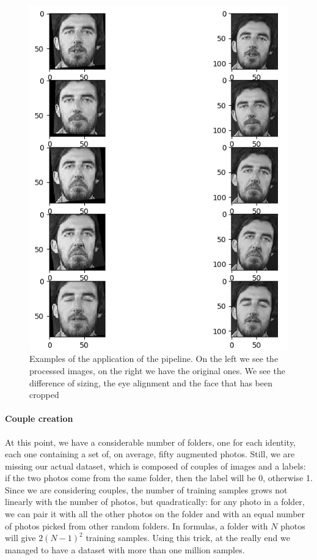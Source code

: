 \begin{figure}[t]
\includegraphics[width=1\linewidth]{images/processed.png}
   \caption{Examples of the application of the pipeline. On the left we see the processed images, on the right we have the original ones. We see the difference of sizing, the eye alignment and the face that has been cropped}
\label{fig:long}
\label{fig:onecol}
\end{figure}

\paragraph{Couple creation}
At this point, we have a considerable number of folders, one for each identity, each one containing a set of, on average, fifty augmented photos. Still, we are missing our actual dataset, which is composed of couples of images and a labels: if the two photos come from the same folder, then the label will be 0, otherwise 1. Since we are considering couples, the number of training samples grows not linearly with the number of photos, but quadratically: for any photo in a folder, we can pair it with all the other photos on the folder and with an equal number of photos picked from other random folders. In formulas, a folder with $N$ photos will give $2(N-1)^2$ training samples.
Using this trick, at the really end we managed to have a dataset with more than one million samples.

